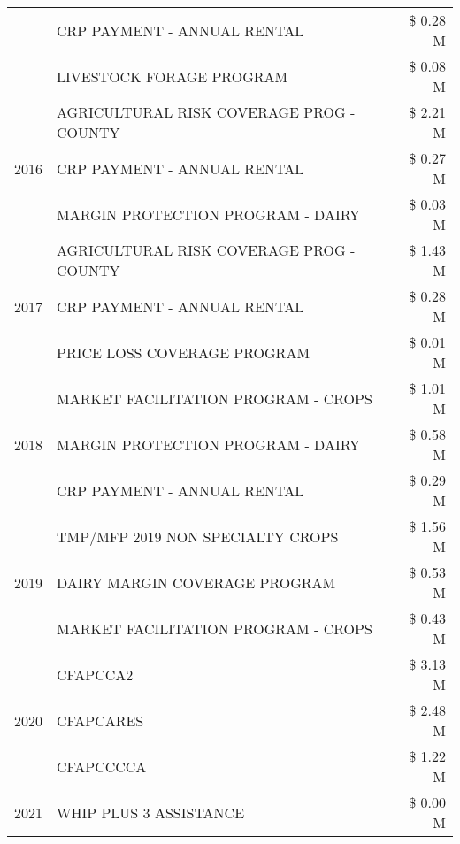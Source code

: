 \begin{tabular}{llr}
 & CRP PAYMENT - ANNUAL RENTAL & \$ 0.28 M \\
 & LIVESTOCK FORAGE PROGRAM & \$ 0.08 M \\
\cline{1-3}
\multirow[t]{3}{*}{2016} & AGRICULTURAL RISK COVERAGE PROG - COUNTY & \$ 2.21 M \\
 & CRP PAYMENT - ANNUAL RENTAL & \$ 0.27 M \\
 & MARGIN PROTECTION PROGRAM - DAIRY & \$ 0.03 M \\
\cline{1-3}
\multirow[t]{3}{*}{2017} & AGRICULTURAL RISK COVERAGE PROG - COUNTY & \$ 1.43 M \\
 & CRP PAYMENT - ANNUAL RENTAL & \$ 0.28 M \\
 & PRICE LOSS COVERAGE PROGRAM & \$ 0.01 M \\
\cline{1-3}
\multirow[t]{3}{*}{2018} & MARKET FACILITATION PROGRAM - CROPS & \$ 1.01 M \\
 & MARGIN PROTECTION PROGRAM - DAIRY & \$ 0.58 M \\
 & CRP PAYMENT - ANNUAL RENTAL & \$ 0.29 M \\
\cline{1-3}
\multirow[t]{3}{*}{2019} & TMP/MFP 2019 NON SPECIALTY CROPS & \$ 1.56 M \\
 & DAIRY MARGIN COVERAGE PROGRAM & \$ 0.53 M \\
 & MARKET FACILITATION PROGRAM - CROPS & \$ 0.43 M \\
\cline{1-3}
\multirow[t]{3}{*}{2020} & CFAPCCA2 & \$ 3.13 M \\
 & CFAPCARES & \$ 2.48 M \\
 & CFAPCCCCA & \$ 1.22 M \\
\cline{1-3}
2021 & WHIP PLUS 3 ASSISTANCE & \$ 0.00 M \\
\cline{1-3}
\bottomrule
\end{tabular}
